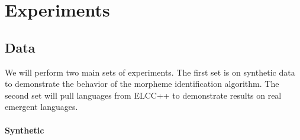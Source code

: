 


\section{Experiments}

\subsection{Data}

We will perform two main sets of experiments.
The first set is on synthetic data to demonstrate the behavior of the morpheme identification algorithm.
The second set will pull languages from ELCC++ to demonstrate results on real emergent languages.

\paragraph{Synthetic}

